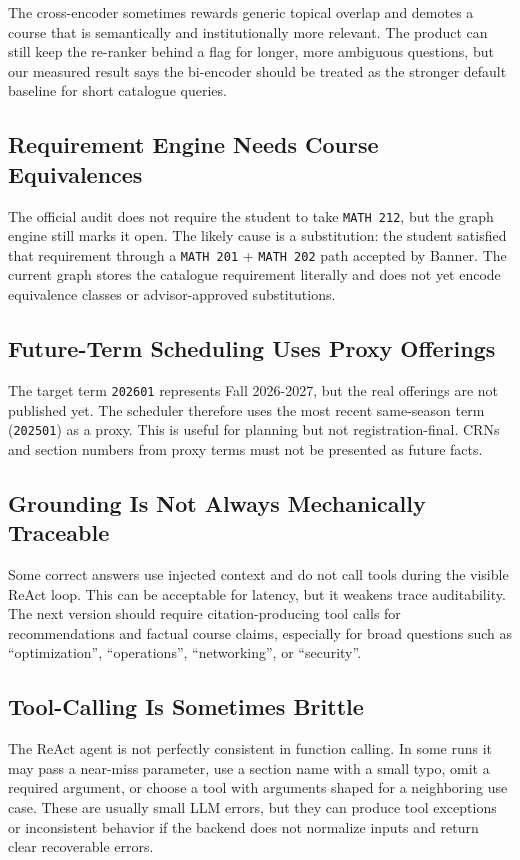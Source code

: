 \documentclass[10pt,letterpaper]{article}
\newcommand{\code}[1]{\texttt{#1}}
\begin{document}
The cross-encoder sometimes rewards generic topical overlap and demotes a course that is semantically and institutionally more relevant. The product can still keep the re-ranker behind a flag for longer, more ambiguous questions, but our measured result says the bi-encoder should be treated as the stronger default baseline for short catalogue queries.

\subsection{Requirement Engine Needs Course Equivalences}
The official audit does not require the student to take \code{MATH 212}, but the graph engine still marks it open. The likely cause is a substitution: the student satisfied that requirement through a \code{MATH 201} + \code{MATH 202} path accepted by Banner. The current graph stores the catalogue requirement literally and does not yet encode equivalence classes or advisor-approved substitutions.

\subsection{Future-Term Scheduling Uses Proxy Offerings}
The target term \code{202601} represents Fall 2026-2027, but the real offerings are not published yet. The scheduler therefore uses the most recent same-season term (\code{202501}) as a proxy. This is useful for planning but not registration-final. CRNs and section numbers from proxy terms must not be presented as future facts.

\subsection{Grounding Is Not Always Mechanically Traceable}
Some correct answers use injected context and do not call tools during the visible ReAct loop. This can be acceptable for latency, but it weakens trace auditability. The next version should require citation-producing tool calls for recommendations and factual course claims, especially for broad questions such as ``optimization'', ``operations'', ``networking'', or ``security''.

\subsection{Tool-Calling Is Sometimes Brittle}
The ReAct agent is not perfectly consistent in function calling. In some runs it may pass a near-miss parameter, use a section name with a small typo, omit a required argument, or choose a tool with arguments shaped for a neighboring use case. These are usually small LLM errors, but they can produce tool exceptions or inconsistent behavior if the backend does not normalize inputs and return clear recoverable errors.
\end{document}
